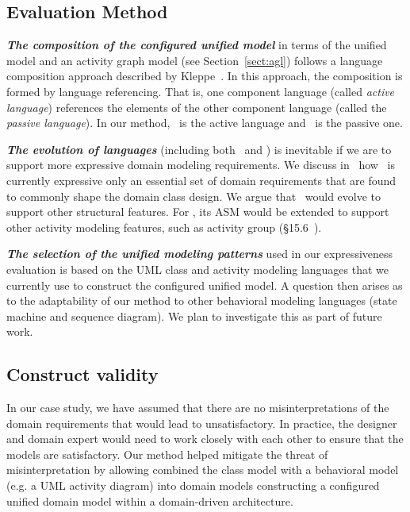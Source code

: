 \subsection{Evaluation Method}
%

\textbf{\textit{The composition of the configured unified model}} in terms of the unified model and an activity graph model (see Section~\ref{sect:agl}) follows a language composition approach described by Kleppe~\cite{kleppe_software_2008}. In this approach, the composition is formed by language referencing. That is, one component language (called \textit{active language}) references the elements of the other component language (called the \textit{passive language}). In our method, \agl~is the active language and \dcsl~is the passive one.

\textbf{\textit{The evolution of languages}} (including both \agl~and \dcsl) is inevitable if we are to support 
more expressive domain modeling requirements. We discuss in~\cite{le_domain_2018} how \dcsl~is currently expressive only \wrt an essential set of domain requirements that are found to commonly shape the domain class design. We argue that \dcsl~would evolve to support other structural features. For \agl, its ASM would be extended to support other activity modeling features, such as activity group (\S{15.6}~\cite{omg_unified_2015}).

\textbf{\textit{The selection of the unified modeling patterns}} used in our expressiveness evaluation is based on the UML class and activity modeling languages that we currently use to construct the configured unified model. A question then arises as to the adaptability of our method to other behavioral modeling languages (\eg state machine and sequence diagram). We plan to investigate this as part of future work.
%
\subsection{Construct validity}
In our case study, we have assumed that there are no misinterpretations of the domain requirements that would lead to unsatisfactory. In practice, the designer and domain expert would need to work closely with each other to ensure that the models are satisfactory.
Our method helped mitigate the threat of misinterpretation by allowing combined the class model with a behavioral model (e.g. a UML activity
diagram) into domain models constructing a configured unified domain model within a domain-driven architecture.
%
